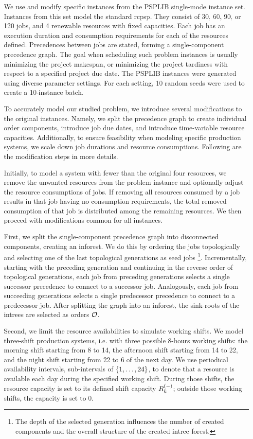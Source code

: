 We use and modify specific instances from the PSPLIB single-mode instance set.
Instances from this set model the standard \ac{rcpsp}.
They consist of 30, 60, 90, or 120 jobs,
and 4 renewable resources with fixed capacities.
Each job has an execution duration and consumption requirements for each of the resources defined.
Precedences between jobs are stated, forming a single-component precedence graph.
The goal when scheduling such problem instances is usually minimizing the project makespan,
or minimizing the project tardiness with respect to a specified project due date.
The PSPLIB instances were generated using diverse parameter settings.
For each setting, 10 random seeds were used to create a 10-instance batch.

To accurately model our studied problem, we introduce several modifications to the original instances.
Namely, we split the precedence graph to create individual order components,
introduce job due dates, and introduce time-variable resource capacities.
Additionally, to ensure feasibility when modeling specific production systems,
we scale down job durations and resource consumptions.
Following are the modification steps in more details.

Initially, to model a system with fewer than the original four resources,
we remove the unwanted resources from the problem instance
and optionally adjust the resource consumptions of jobs.
If removing all resources consumed by a job results in that job having no consumption requirements,
the total removed consumption of that job is distributed among the remaining resources.
We then proceed with modifications common for all instances.

First, we split the single-component precedence graph into disconnected components,
creating an inforest.
We do this by ordering the jobs topologically
and selecting one of the last topological generations as seed jobs%
\footnote{The depth of the selected generation influences the number of created components
and the overall structure of the created intree forest.}.
Incrementally, starting with the preceding generation
and continuing in the reverse order of topological generations,
each job from preceding generations selects a single successor precedence
to connect to a successor job.
Analogously, each job from succeeding generations selects a single predecessor precedence
to connect to a predecessor job.
After splitting the graph into an inforest,
the sink-roots of the intrees are selected as orders $\mathcal{O}$.

Second, we limit the resource availabilities to simulate working shifts.
We model three-shift production systems, i.e. with three possible 8-hours working shifts:
the morning shift starting from 8 to 14,
the afternoon shift starting from 14 to 22,
and the night shift starting from 22 to 6 of the next day.
We use periodical availability intervals, sub-intervals of $\{{1}, \dots, {24}\}$,
to denote that a resource is available each day during the specified working shift.
During those shifts, the resource capacity is set to its defined shift capacity $\shiftcapacity{k}$;
outside those working shifts, the capacity is set to $0$.

